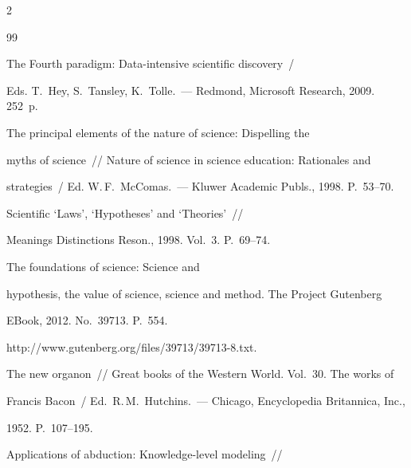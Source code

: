  \begin{multicols}{2}





\renewcommand{\bibname}{\protect\rmfamily Литература}







{\small\frenchspacing


{%


\begin{thebibliography}{99}




The Fourth paradigm: Data-intensive scientific discovery~/


Eds. T.~Hey, S.~Tansley, K.~Tolle.~--- Redmond, Microsoft Research, 2009.  252~p.




 The principal elements of the nature of science: Dispelling the


myths of science~// Nature of science in science education: Rationales and


strategies~/ Ed. W.\,F.~McComas.~--- Kluwer Academic Publs., 1998. P.~53--70.




 Scientific `Laws', `Hypotheses' and `Theories'~//


Meanings Distinctions Reson., 1998. Vol.~3. P.~69--74.




 The foundations of science: Science and


hypothesis, the value of science,  science and method. The Project Gutenberg


EBook, 2012. No.~39713. P.~554.


{\sf http://www.gutenberg.org/files/39713/39713-8.txt}.




 The new organon~// Great books of the Western World. Vol.~30. The works of


Francis Bacon~/ Ed.\ R.\,M.~Hutchins.~--- Chicago, Encyclopedia Britannica, Inc.,


1952.  P.~107--195.




 Applications of abduction: Knowledge-level modeling~//



\end{thebibliography}}}
\end{multicols}
